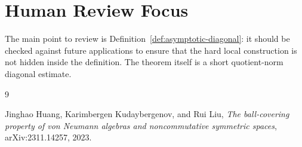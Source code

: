 \documentclass[11pt]{article}
\begin{document}
\section*{Human Review Focus}

The main point to review is Definition~\ref{def:asymptotic-diagonal}: it
should be checked against future applications to ensure that the hard local
construction is not hidden inside the definition.  The theorem itself is a
short quotient-norm diagonal estimate.

\begin{thebibliography}{9}

Jinghao Huang, Karimbergen Kudaybergenov, and Rui Liu,
\emph{The ball-covering property of von Neumann algebras and noncommutative
symmetric spaces},
arXiv:2311.14257, 2023.

\end{thebibliography}
\end{document}
